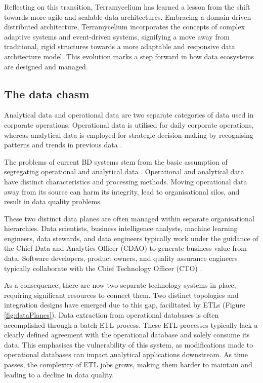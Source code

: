 \documentclass[review]{elsarticle}
\begin{document}
Reflecting on this transition, Terramycelium has learned a lesson from the shift towards more agile and scalable data architectures. Embracing a domain-driven distributed architecture, Terramycelium incorporates the concepts of complex adaptive systems and event-driven systems, signifying a move away from traditional, rigid structures towards a more adaptable and responsive data architecture model. This evolution marks a step forward in how data ecosystems are designed and managed.

\subsection{The data chasm}

Analytical data and operational data are two separate categories of data used in corporate operations. Operational data is utilised for daily corporate operations, whereas analytical data is employed for strategic decision-making by recognising patterns and trends in previous data \cite{kimball2013data}.

The problems of current BD systems stem from the basic assumption of segregating operational and analytical data \cite{ataei2022state}. Operational and analytical data have distinct characteristics and processing methods. Moving operational data away from its source can harm its integrity, lead to organisational silos, and result in data quality problems. 

These two distinct data planes are often managed within separate organisational hierarchies. Data scientists, business intelligence analysts, machine learning engineers, data stewards, and data engineers typically work under the guidance of the Chief Data and Analytics Officer (CDAO) to generate business value from data. Software developers, product owners, and quality assurance engineers typically collaborate with the Chief Technology Officer (CTO) \cite{DataMesh}.

As a consequence, there are now two separate technology systems in place, requiring significant resources to connect them. Two distinct topologies and integration designs have emerged due to this gap, facilitated by ETLs (Figure \ref{fig:dataPlanes}). Data extraction from operational databases is often accomplished through a batch ETL process. These ETL processes typically lack a clearly defined agreement with the operational database and solely consume its data. This emphasises the vulnerability of this system, as modifications made to operational databases can impact analytical applications downstream. As time passes, the complexity of ETL jobs grows, making them harder to maintain and leading to a decline in data quality. 
\end{document}
